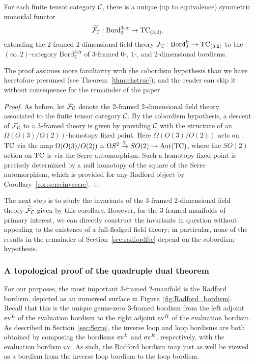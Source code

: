 \documentclass{amsart}
\begin{document}
\begin{corollary} \label{cor:3fr2d}
For each finite tensor category $\mathcal C$, there is a unique (up to equivalence) symmetric monoidal functor
\[
\widetilde{\mathcal F_\mathcal C} : \mathrm{Bord}^{3\text{-}\mathrm{fr}}_2 \rightarrow \mathrm{TC}_{(3,2)},
\]
extending the 2-framed 2-dimensional field theory $\mathcal F_\mathcal C: \mathrm{Bord}^\mathrm{fr}_2 \rightarrow \mathrm{TC}_{(3,2)}$ to the $(\infty,2)$-category $\mathrm{Bord}^{3\text{-}\mathrm{fr}}_2$ of 3-framed 0-, 1-, and 2-dimensional bordisms.
\end{corollary}

\nid The proof assumes more familiarity with the cobordism hypothesis than we have heretofore presumed (see Theorem~\ref{thm:chstruc}), and the reader can skip it without consequence for the remainder of the paper.

\begin{proof}
As before, let $\mathcal F_\mathcal C$ denote the 2-framed 2-dimensional field theory associated to the finite tensor category $\mathcal C$.  By the cobordism hypothesis, a descent of $\mathcal F_\mathcal C$ to a 3-framed theory is given by providing $\mathcal C$ with the structure of an $\Omega(O(3)/O(2))$-homotopy fixed point.  Here $\Omega(O(3)/O(2))$ acts on $\mathrm{TC}$ via the map $\Omega(O(3)/O(2)) \simeq \Omega S^2 \xrightarrow{2} SO(2) \rightarrow \mathrm{Aut}(\mathrm{TC})$, where the $SO(2)$ action on $\mathrm{TC}$ is via the Serre automorphism.  Such a homotopy fixed point is precisely determined by a null homotopy of the square of the Serre automorphism, which is provided for any Radford object by Corollary~\ref{cor:serreinvserre}.
\end{proof}

The next step is to study the invariants of the 3-framed 2-dimensional field theory $\widetilde{\mathcal F_\mathcal C}$ given by this corollary.  However, for the 3-framed manifolds of primary interest, we can directly construct the invariants in question without appealing to the existence of a full-fledged field theory; in particular, none of the results in the remainder of Section~\ref{sec:radfordftc} depend on the cobordism hypothesis.

\subsubsection{A topological proof of the quadruple dual theorem} \label{sec:topquaddual}

For our purposes, the most important 3-framed 2-manifold is the Radford bordism, depicted as an immersed surface in Figure~\ref{fig:Radford_bordism}.  Recall that this is the unique genus-zero 3-framed bordism from the left adjoint $\mathrm{ev}^L$ of the evaluation bordism to the right adjoint $\mathrm{ev}^R$ of the evaluation bordism.  As described in Section~\ref{sec:Serre}, the inverse loop and loop bordisms are both obtained by composing the bordisms $\mathrm{ev}^L$ and $\mathrm{ev}^R$, respectively, with the evaluation bordism $\mathrm{ev}$.  As such, the Radford bordism may just as well be viewed as a bordism from the inverse loop bordism to the loop bordism.  
\end{document}
